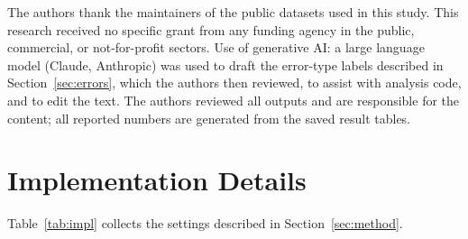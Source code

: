 \documentclass[manuscript,screen,review]{acmart}
\newcommand{\fit}[1]{\resizebox{\ifdim\width>\linewidth\linewidth\else\width\fi}{!}{#1}}
\begin{document}
\begin{acks}
The authors thank the maintainers of the public datasets used in this study. This research received no specific grant from any funding agency in the public, commercial, or not-for-profit sectors. Use of generative AI: a large language model (Claude, Anthropic) was used to draft the error-type labels described in Section~\ref{sec:errors}, which the authors then reviewed, to assist with analysis code, and to edit the text. The authors reviewed all outputs and are responsible for the content; all reported numbers are generated from the saved result tables.
\end{acks}




\appendix
\section{Implementation Details}\label{app:impl}
Table~\ref{tab:impl} collects the settings described in Section~\ref{sec:method}.

\begin{table}[h]
\caption{Implementation details of the fine-tuned detectors and the evaluation.}
\label{tab:impl}
\small
\fit{}
\end{table}
\end{document}
